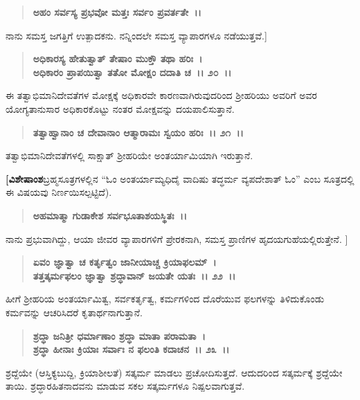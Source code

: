 \begin{verse}
\textbf{ಅಹಂ ಸರ್ವಸ್ಯ ಪ್ರಭವೋ ಮತ್ತಃ ಸರ್ವಂ ಪ್ರವರ್ತತೇ~।।} 
\end{verse}

ನಾನು ಸಮಸ್ತ ಜಗತ್ತಿಗೆ ಉತ್ಪಾದಕನು. ನನ್ನಿಂದಲೇ ಸಮಸ್ತ ವ್ಯಾಪಾರಗಳೂ ನಡೆಯುತ್ತವೆ.]

\begin{verse}
\textbf{ಅಧಿಕಾರಸ್ಯ ಹೇತುತ್ವಾತ್ ತೇಷಾಂ ಮುಕ್ತೌ ತಥಾ ಹರಿಃ~।}\\\textbf{ಅಧಿಕಾರಂ ಪ್ರಾಪಯಿತ್ವಾ ತತೋ ಮೋಕ್ಷಂ ದದಾತಿ ಚ~।। ೨೦~।।}
\end{verse}

ಈ ತತ್ವಾಭಿಮಾನಿದೇವತೆಗಳ ಮೋಕ್ಷಕ್ಕೆ ಅಧಿಕಾರವೇ ಕಾರಣವಾಗಿರುವುದರಿಂದ ಶ‍್ರೀಹರಿಯು ಅವರಿಗೆ ಅವರ ಯೋಗ್ಯತಾನುಸಾರ ಅಧಿಕಾರಕೊಟ್ಟು ನಂತರ ಮೋಕ್ಷವನ್ನು ದಯಪಾಲಿಸುತ್ತಾನೆ.

\begin{verse}
\textbf{ತತ್ವಾಹ್ವಾನಾಂ ಚ ದೇವಾನಾಂ ಆತ್ಮಾರಾಮಃ ಸ್ವಯಂ ಹರಿಃ~।। ೨೧~।।}
\end{verse}

ತತ್ವಾಭಿಮಾನಿದೇವತೆಗಳಲ್ಲಿ ಸಾಕ್ಷಾತ್ ಶ‍್ರೀಹರಿಯೇ ಅಂತರ್ಯಾಮಿಯಾಗಿ ಇರುತ್ತಾನೆ.

\textbf{[ವಿಶೇಷಾಂಶ\enginline{-}}ಬ್ರಹ್ಮಸೂತ್ರಗಳಲ್ಲಿನ “ಓಂ ಅಂತರ್ಯಾಮ್ಯಧಿದೈ ವಾದಿಷು ತದ್ಧರ್ಮ ವ್ಯಪದೇಶಾತ್ ಓಂ” ಎಂಬ ಸೂತ್ರದಲ್ಲಿ ಈ ವಿಷಯವು ನಿರ್ಣಯಿಸಲ್ಪಟ್ಟಿದೆ).

\begin{verse}
\textbf{ಅಹಮಾತ್ಮಾ ಗುಡಾಕೇಶ ಸರ್ವಭೂತಾಶಯಸ್ಥಿತಃ~।।} 
\end{verse}

ನಾನು ಪ್ರಭುವಾಗಿದ್ದು, ಆಯಾ ಜೀವರ ವ್ಯಾಪಾರಗಳಿಗೆ ಪ್ರೇರಕನಾಗಿ, ಸಮಸ್ತ ಪ್ರಾಣಿಗಳ ಹೃದಯಗುಹೆಯಲ್ಲಿರುತ್ತೇನೆ. ]

\begin{verse}
\textbf{ಏವಂ ಜ್ಞಾತ್ವಾ ಚ ಕರ್ತೃತ್ವಂ ಜಾನೀಯಾಚ್ಚ ಕ್ರಿಯಾಫಲಮ್~।}\\\textbf{ತತ್ತತ್ಕರ್ಮಫಲಂ ಜ್ಞಾತ್ವಾ ಶ್ರದ್ಧಾವಾನ್ ಜಯತೇ ಯತಃ~।। ೨೨~।।}
\end{verse}

ಹೀಗೆ ಶ‍್ರೀಹರಿಯ ಅಂತರ್ಯಾಮಿತ್ವ, ಸರ್ವಕರ್ತೃತ್ವ, ಕರ್ಮಗಳಿಂದ ದೊರೆಯುವ ಫಲಗಳನ್ನು ತಿಳಿದುಕೊಂಡು ಕರ್ಮವನ್ನು ಆಚರಿಸಿದರೆ ಕೃತಾರ್ಥನಾಗುತ್ತಾನೆ.

\begin{verse}
\textbf{ಶ್ರದ್ಧಾ ಜನಿತ್ರೀ ಧರ್ಮಾಣಾಂ ಶ್ರದ್ಧಾ ಮಾತಾ ಪರಾಮತಾ~।}\\\textbf{ಶ್ರದ್ಧಾ ಹೀನಾಃ ಕ್ರಿಯಾಃ ಸರ್ವಾಃ ನ ಫಲಂತಿ ಕದಾಚನ~।। ೨೩~।।}
\end{verse}

ಶ್ರದ್ದೆಯೇ (ಆಸ್ತಿಕ್ಯಬುದ್ದಿ, ಕ್ರಿಯಾಶೀಲತೆ) ಸತ್ಕರ್ಮ ಮಾಡಲು ಪ್ರಚೋದಿಸುತ್ತದೆ. ಆದುದರಿಂದ ಸತ್ಕರ್ಮಕ್ಕೆ ಶ್ರದ್ದೆಯೇ ತಾಯಿ. ಶ್ರದ್ಧಾರಹಿತನಾದವನು ಮಾಡುವ ಸಕಲ ಸತ್ಕರ್ಮಗಳೂ ನಿಷ್ಪಲವಾಗುತ್ತವೆ.

